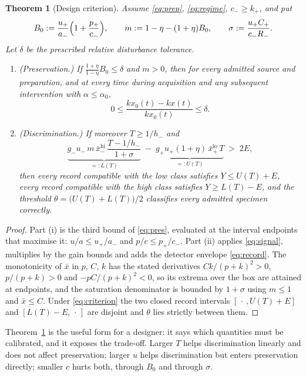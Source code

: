 \documentclass[11pt]{article}
\newtheorem{theorem}{Theorem}[section]
\theoremstyle{definition}
\theoremstyle{remark}
\newcommand{\xb}{\bar{x}}
\begin{document}
\begin{theorem}[Design criterion]\label{thm:criterion}
Assume \eqref{eq:prep}, \eqref{eq:regime}, $c_-\ge k_+$, and put
\[
B_0:=\frac{u_+}{a_-}\Bigl(1+\frac{p_+}{c_-}\Bigr),\qquad
m:=1-\eta-(1+\eta)B_0,\qquad
\sigma:=\frac{u_+C_+}{c_-R_-} .
\]
Let $\delta$ be the prescribed relative disturbance tolerance.
\begin{enumerate}
\item[\textup{(i)}] \textup{(Preservation.)} If
$\frac{1+\eta}{1-\eta}B_0\le\delta$ and $m>0$, then for every admitted source and
preparation, and at every time during acquisition and any subsequent
intervention with $\alpha\le\alpha_0$,
\[
0\le\frac{kx_0(t)-kx(t)}{kx_0(t)}\le\delta .
\]
\item[\textup{(ii)}] \textup{(Discrimination.)} If moreover $T\ge1/h_-$ and
\begin{equation}
\underbrace{g_-u_-\,m\,\xb^{\mathrm{hi}}_-\,\frac{T-1/h_-}{1+\sigma}}_{=:L(T)}
\;-\;
\underbrace{g_+u_+(1+\eta)\,\xb^{\mathrm{lo}}_+\,T}_{=:U(T)}
\;>\;2E ,
\label{eq:criterion}
\end{equation}
then every record compatible with the low class satisfies $Y\le U(T)+E$, every
record compatible with the high class satisfies $Y\ge L(T)-E$, and the threshold
$\theta=\bigl(U(T)+L(T)\bigr)/2$ classifies every admitted specimen correctly.
\end{enumerate}
\end{theorem}

\begin{proof}
Part (i) is the third bound of \eqref{eq:pres}, evaluated at the interval
endpoints that maximise it: $u/a\le u_+/a_-$ and $p/c\le p_+/c_-$. Part (ii)
applies \eqref{eq:signal}, multiplies by the gain bounds and adds the detector
envelope \eqref{eq:record}. The monotonicity of $\xb$ in $p$, $C$, $k$ has the
stated derivatives $Ck/(p+k)^2>0$, $p/(p+k)>0$ and $-pC/(p+k)^2<0$, so its
extrema over the box are attained at endpoints, and the saturation denominator
is bounded by $1+\sigma$ using $m\le1$ and $\xb\le C$. Under
\eqref{eq:criterion} the two closed record intervals $[\,\cdot\,,U(T)+E]$ and
$[L(T)-E,\,\cdot\,]$ are disjoint and $\theta$ lies strictly between them.
\end{proof}

Theorem~\ref{thm:criterion} is the useful form for a designer: it says which
quantities must be calibrated, and it exposes the trade-off. Larger $T$ helps
discrimination linearly and does not affect preservation; larger $u$ helps
discrimination but enters preservation directly; smaller $c$ hurts both, through
$B_0$ and through $\sigma$.
\end{document}
